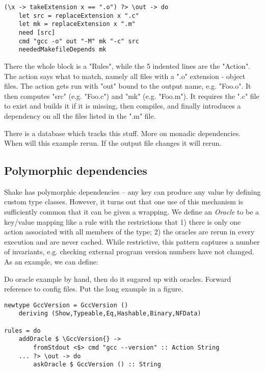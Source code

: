 
\begin{lstlisting}
(\x -> takeExtension x == ".o") ?> \out -> do
    let src = replaceExtension x ".c"
    let mk = replaceExtension x ".m"
    need [src]
    cmd "gcc -o" out "-M" mk "-c" src
    neededMakefileDepends mk
\end{lstlisting}

There the whole block is a \lst"Rules", while the 5 indented lines are the \lst"Action". The action says what to match, namely all files with a \lst".o" extension - object files. The action gets run with \lst"out" bound to the output name, e.g. \lst"Foo.o". It then computes \lst"src" (e.g. \lst"Foo.c") and \lst"mk" (e.g. \lst"Foo.m"). It requires the \lst".c" file to exist and builds it if it is missing, then compiles, and finally introduces a dependency on all the files listed in the \lst".m" file.

There is a database which tracks this stuff. More on monadic dependencies. When will this example rerun. If the output file changes it will rerun.

\subsection{Polymorphic dependencies}

Shake has polymorphic dependencies -- any key can produce any value by defining custom type classes. However, it turns out that one use of this mechanism is sufficiently common that it can be given a wrapping. We define an \textit{Oracle} to be a key/value mapping like a rule with the restrictions that 1) there is only one action associated with all members of the type; 2) the oracles are rerun in every execution and are never cached. While restrictive, this pattern captures a number of invariants, e.g. checking external program version numbers have not changed. As an example, we can define:

Do oracle example by hand, then do it sugared up with oracles. Forward reference to config files. Put the long example in a figure.

\begin{lstlisting}
newtype GccVersion = GccVersion ()
    deriving (Show,Typeable,Eq,Hashable,Binary,NFData)

rules = do
    addOracle $ \GccVersion{} ->
        fromStdout <$> cmd "gcc --version" :: Action String
    ... ?> \out -> do
        askOracle $ GccVersion () :: String
\end{lstlisting}

